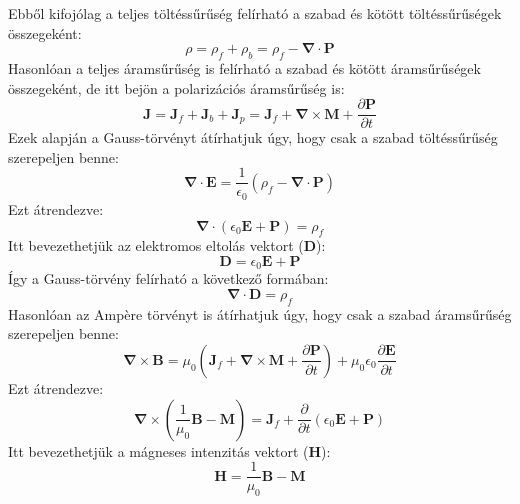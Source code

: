 \documentclass[../main.tex]{subfiles}
\begin{document}
Ebből kifojólag a teljes töltéssűrűség felírható a szabad és kötött töltéssűrűségek összegeként:
\begin{equation}
    \rho = \rho_f + \rho_b = \rho_f - \boldsymbol{\nabla} \cdot \mathbf{P}
\end{equation}
Hasonlóan a teljes áramsűrűség is felírható a szabad és kötött áramsűrűségek összegeként, de itt bejön a polarizációs áramsűrűség is:
\begin{equation}
    \mathbf{J} = \mathbf{J}_f + \mathbf{J}_b + \mathbf{J}_p = \mathbf{J}_f + \boldsymbol{\nabla} \times \mathbf{M} + \frac{\partial \mathbf{P}}{\partial t}
\end{equation}
Ezek alapján a Gauss-törvényt átírhatjuk úgy, hogy csak a szabad töltéssűrűség szerepeljen benne:
\begin{equation}
    \boldsymbol{\nabla} \cdot \mathbf{E} = \frac{1}{\epsilon_0} \left( \rho_f - \boldsymbol{\nabla} \cdot \mathbf{P} \right)
\end{equation}
Ezt átrendezve:
\begin{equation}
    \boldsymbol{\nabla} \cdot \left( \epsilon_0 \mathbf{E} + \mathbf{P} \right) = \rho_f
\end{equation}
Itt bevezethetjük az elektromos eltolás vektort ($\mathbf{D}$):
\begin{equation}
    \mathbf{D} = \epsilon_0 \mathbf{E} + \mathbf{P}
\end{equation}
Így a Gauss-törvény felírható a következő formában:
\begin{equation}
    \boldsymbol{\nabla} \cdot \mathbf{D} = \rho_f
\end{equation}
Hasonlóan az Ampère törvényt is átírhatjuk úgy, hogy csak a szabad áramsűrűség szerepeljen benne:
\begin{equation}
    \boldsymbol{\nabla} \times \mathbf{B} = \mu_0 \left( \mathbf{J}_f + \boldsymbol{\nabla} \times \mathbf{M} + \frac{\partial \mathbf{P}}{\partial t} \right) + \mu_0 \epsilon_0 \frac{\partial \mathbf{E}}{\partial t}
\end{equation}
Ezt átrendezve:
\begin{equation}
    \boldsymbol{\nabla} \times \left( \frac{1}{\mu_0} \mathbf{B} - \mathbf{M} \right) = \mathbf{J}_f + \frac{\partial }{\partial t} \left( \epsilon_0 \mathbf{E} + \mathbf{P} \right)
\end{equation}
Itt bevezethetjük a mágneses intenzitás vektort ($\mathbf{H}$):
\begin{equation}
    \mathbf{H} = \frac{1}{\mu_0} \mathbf{B} - \mathbf{M}
\end{equation}
\end{document}
